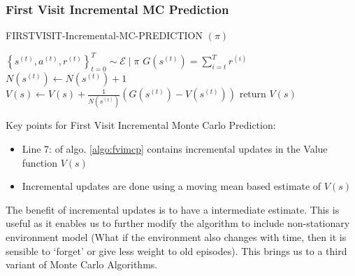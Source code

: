 \documentclass[11pt]{article}
\begin{document}
\subsubsection* {First Visit Incremental MC Prediction}
\begin{algorithm}[H]
\caption{FIRSTVISIT-Incremental-MC-PREDICTION $(\pi)$}
\label{algo:fvimcp}
\begin{algorithmic}[1]
\STATE $\left\{s^{(t)}, a^{(t)}, r^{(t)}\right\}_{t=0}^{T} \sim \mathcal{E} \mid \pi$
\STATE $G\left(s^{(t)}\right) = \sum_{i=t}^{T} r^{(i)}$
\STATE $N\left(s^{(t)}\right) \leftarrow N\left(s^{(t)}\right)+1$
\STATE $V(s) \leftarrow V(s) + \frac{1}{N(s^{(t)})} (G(s^{(t)}) - V(s^{(t)}))$
\ENDIF
\ENDFOR
\ENDFOR
\STATE $\text{return } V(s) $
\end{algorithmic}
\end{algorithm}
\newpage
Key points for First Visit Incremental Monte Carlo Prediction:
\begin{itemize}
    \item Line 7: of algo. \ref{algo:fvimcp} contains incremental updates in the Value function $V(s)$
    \item Incremental updates are done using a moving mean based estimate of $V(s)$
\end{itemize}
The benefit of incremental updates is to have a intermediate estimate. This is useful as it enables us to further modify the algorithm to include non-stationary environment model (What if the environment also changes with time, then it is sensible to  `forget' or give less weight to old episodes). This brings us to a third variant of Monte Carlo Algorithms.
\end{document}
